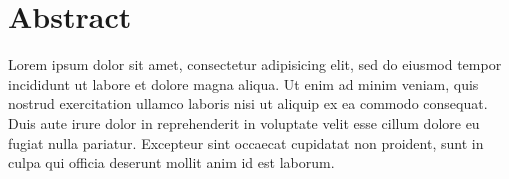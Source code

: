 \documentclass[report.tex]{subfiles}
\begin{document}
{}
\chapter*{Abstract} %
\label{cha:abstract}
Lorem ipsum dolor sit amet, consectetur adipisicing elit, sed do eiusmod
tempor incididunt ut labore et dolore magna aliqua. Ut enim ad minim veniam,
quis nostrud exercitation ullamco laboris nisi ut aliquip ex ea commodo
consequat. Duis aute irure dolor in reprehenderit in voluptate velit esse
cillum dolore eu fugiat nulla pariatur. Excepteur sint occaecat cupidatat non
proident, sunt in culpa qui officia deserunt mollit anim id est laborum.

\newpage
\end{document}
